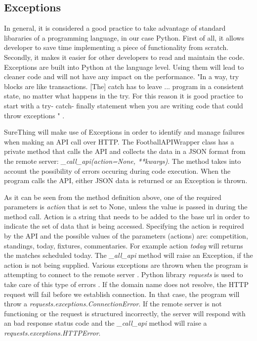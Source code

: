 \subsection{Exceptions}
\label{subsec:exceptions}
In general, it is considered a good practice to take advantage of standard libararies of a programming language, in our case Python. First of all, it allows developer to save time implementing a piece of functionality from scratch. Secondly, it makes it easier for other developers to read and maintain the code. Exceptions are built into Python at the language level. Using them will lead to cleaner code and will not have any impact on the performance. "In a way, try blocks are like transactions. [The] catch has to leave ... program in a consistent state, no matter what happens in the try. For this reason it is good practice to start with a try- catch- finally statement when you are writing code that could throw exceptions " \cite{book:martin2011robert}.
 
SureThing will make use of Exceptions in order to identify and manage failures when making an API call over HTTP. The FootballAPIWrapper class has a private method that calls the API and collects the data in a JSON format from the remote server: \emph{\_call\_api(action=None, **kwargs)}. The method takes into account the possibility of errors occuring during code execution. When the program calls the API, either JSON data is returned or an Exception is thrown. 

As it can be seen from the method definition above, one of the required parameters is \emph{action} that is set to None, unless the value is passed in during the method call. Action is a string that needs to be added to the base url in order to indicate the set of data that is being accessed. Specifying the action is required by the API and the possible values of the parameters (actions) are: competition, standings, today, fixtures, commentaries. For example action \emph{today} will returns the matches scheduled today. The \emph{\_all\_api} method will raise an Exception, if the action is not being supplied. Various exceptions are thrown when the program is attempting to connect to the remote server \cite{article:httpRequestsExceptions}. Python library \emph{requests} is used to take care of this type of errors \cite{documentation:PythonRequests}. If the domain name does not resolve, the HTTP request will fail before we establish connection. In that case, the program will throw a \emph{requests.exceptions.ConnectionError}. If the remote server is not functioning or the request is structured incorrectly, the server will respond with an bad response status code and the \emph{\_call\_api} method will raise a \emph{requests.exceptions.HTTPError}.

